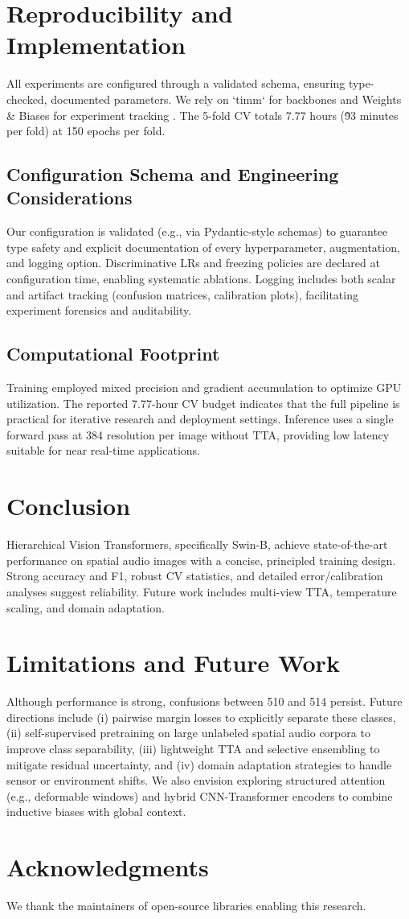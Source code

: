 \documentclass[11pt,a4paper]{article}
\begin{document}
\section{Reproducibility and Implementation}
All experiments are configured through a validated schema, ensuring type-checked, documented parameters. We rely on `timm` \cite{wightman2019timm} for backbones and Weights \& Biases for experiment tracking \cite{biewald2020wandb}. The 5-fold CV totals 7.77 hours (\~93 minutes per fold) at 150 epochs per fold.

\subsection{Configuration Schema and Engineering Considerations}
Our configuration is validated (e.g., via Pydantic-style schemas) to guarantee type safety and explicit documentation of every hyperparameter, augmentation, and logging option. Discriminative LRs and freezing policies are declared at configuration time, enabling systematic ablations. Logging includes both scalar and artifact tracking (confusion matrices, calibration plots), facilitating experiment forensics and auditability.

\subsection{Computational Footprint}
Training employed mixed precision and gradient accumulation to optimize GPU utilization. The reported 7.77-hour CV budget indicates that the full pipeline is practical for iterative research and deployment settings. Inference uses a single forward pass at 384 resolution per image without TTA, providing low latency suitable for near real-time applications.

\section{Conclusion}
Hierarchical Vision Transformers, specifically Swin-B, achieve state-of-the-art performance on spatial audio images with a concise, principled training design. Strong accuracy and F1, robust CV statistics, and detailed error/calibration analyses suggest reliability. Future work includes multi-view TTA, temperature scaling, and domain adaptation.

\section*{Limitations and Future Work}
Although performance is strong, confusions between 510 and 514 persist. Future directions include (i) pairwise margin losses to explicitly separate these classes, (ii) self-supervised pretraining on large unlabeled spatial audio corpora to improve class separability, (iii) lightweight TTA and selective ensembling to mitigate residual uncertainty, and (iv) domain adaptation strategies to handle sensor or environment shifts. We also envision exploring structured attention (e.g., deformable windows) and hybrid CNN-Transformer encoders to combine inductive biases with global context.

\section*{Acknowledgments}
We thank the maintainers of open-source libraries enabling this research.



\end{document}

